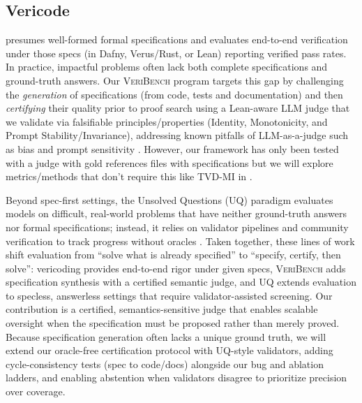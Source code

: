 \documentclass[numbers]{article}
\begin{document}
\subsection{Vericode}
\citet{bursuc2025benchmarkvericodingformallyverified} presumes well-formed formal specifications and evaluates end-to-end verification under those specs (in Dafny, Verus/Rust, or Lean) reporting verified pass rates.
In practice, impactful problems often lack both complete specifications and ground-truth answers.
Our \textsc{VeriBench} program targets this gap by challenging the \emph{generation} of specifications (from code, tests and documentation) and then \emph{certifying} their quality prior to proof search using a Lean-aware LLM judge that we validate via falsifiable principles/properties (Identity, Monotonicity, and Prompt Stability/Invariance), addressing known pitfalls of LLM-as-a-judge such as bias and prompt sensitivity \citep{Zheng2023MTBench,Kocmi2024HumanVsLLM,Li2024TrustLLMJudgments}.
However, our framework has only been tested with a judge with gold references files with specifications but we will explore metrics/methods that don't require this like TVD-MI in \citep{robertson2025stepbystep}.

Beyond spec-first settings, the Unsolved Questions (UQ) paradigm evaluates models on difficult, real-world problems that have neither ground-truth answers nor formal specifications; instead, it relies on validator pipelines and community verification to track progress without oracles \cite{nie2025uqassessinglanguagemodels,uq2025}.
Taken together, these lines of work shift evaluation from “solve what is already specified” to “specify, certify, then solve”:
vericoding provides end-to-end rigor under given specs, \textsc{VeriBench} adds specification synthesis with a certified semantic judge, and UQ extends evaluation to specless, answerless settings that require validator-assisted screening.
Our contribution is a certified, semantics-sensitive judge that enables scalable oversight when the specification must be proposed rather than merely proved.
Because specification generation often lacks a unique ground truth, we will extend our oracle-free certification protocol with UQ-style validators, adding cycle-consistency tests (spec to code/docs) alongside our bug and ablation ladders, and enabling abstention when validators disagree to prioritize precision over coverage.
\end{document}
